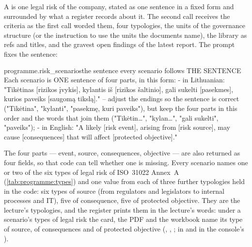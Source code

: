A  is one legal risk of the company, stated as one sentence in a fixed form
and surrounded by what a register records about it. The second call receives the criteria as
the first call worded them, four typologies, the units of the governance structure (or the
instruction to use the units the documents name), the library as refs and titles, and the
gravest open findings of the latest report. The prompt 
fixes the sentence:

\begin{promptexcerpt}{programme.risk_scenarios}{the sentence every scenario follows}
THE SENTENCE
Each scenario is ONE sentence of four parts, in this form:
- in Lithuanian: "Tikėtinas [rizikos įvykis], kylantis iš [rizikos šaltinio], gali sukelti [pasekmes], kurios paveiks [saugomą tikslą]." – adjust the endings so the sentence is correct ("Tikėtina", "kylanti", "pasekmę, kuri paveiks"), but keep the four parts in this order and the words that join them ("Tikėtin…", "kylan…", "gali sukelti", "paveiks");
- in English: "A likely [risk event], arising from [risk source], may cause [consequences] that will affect [protected objective]."
\end{promptexcerpt}

The four parts --- event, source, consequences, objective --- are also returned as four
fields, so that code can tell whether one is missing. Every scenario names one or two of the
six types of legal risk of ISO~31022 Annex~A (\cref{tab:programme:types}) and one value from
each of three further typologies held in the code: six types of source (from regulators and
legislators to internal processes and IT), five of consequence, five of protected objective.
They are the lecture's typologies, and the register prints them in the lecture's words: under
a scenario's types of legal risk the card, the PDF and the workbook name its type of source,
of consequences and of protected objective (, ,
;  in  and in the
console's ).


